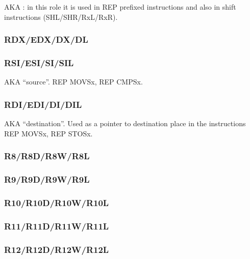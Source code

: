 \ac{AKA} : 
{in this role it is used in REP prefixed instructions and also in shift instructions}
(SHL/SHR/RxL/RxR).

\subsubsection{RDX/EDX/DX/DL}

\subsubsection{RSI/ESI/SI/SIL}

\ac{AKA} ``source''.  
REP MOVSx, REP CMPSx.

\subsubsection{RDI/EDI/DI/DIL}

\ac{AKA} ``destination''. 
{Used as a pointer to destination place in the instructions} REP MOVSx, REP STOSx.

\subsubsection{R8/R8D/R8W/R8L}

\subsubsection{R9/R9D/R9W/R9L}

\subsubsection{R10/R10D/R10W/R10L}

\subsubsection{R11/R11D/R11W/R11L}

\subsubsection{R12/R12D/R12W/R12L}

